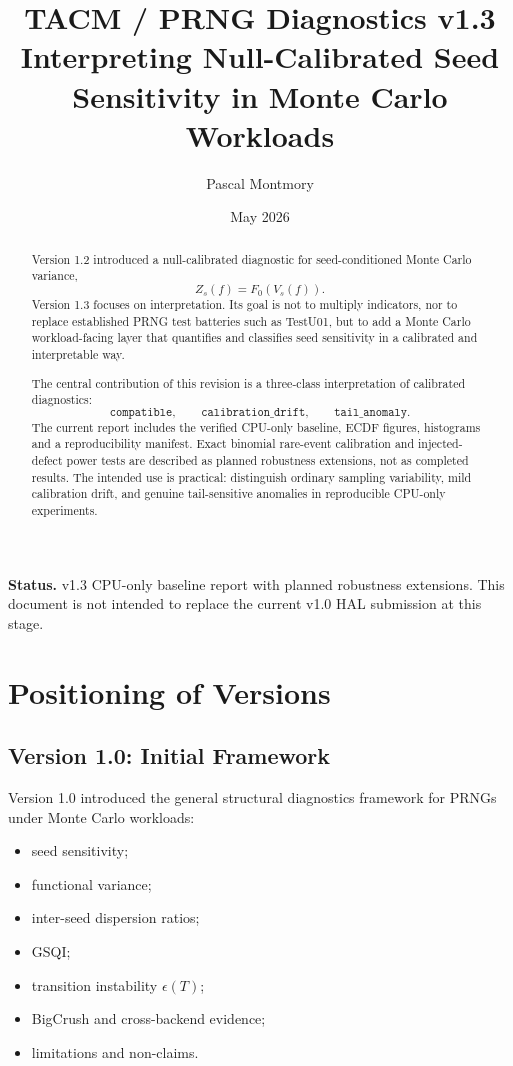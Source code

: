 \documentclass[11pt,a4paper]{article}
\title{\textbf{TACM / PRNG Diagnostics v1.3}\\
\large Interpreting Null-Calibrated Seed Sensitivity in Monte Carlo Workloads}
\author{Pascal Montmory}
\date{May 2026}
\begin{document}
\maketitle
\noindent\textbf{Status.} v1.3 CPU-only baseline report with planned robustness extensions. This document is not intended to replace the current v1.0 HAL submission at this stage.

\begin{abstract}
Version 1.2 introduced a null-calibrated diagnostic for seed-conditioned Monte Carlo variance,
\[
Z_s(f)=F_0(V_s(f)).
\]
Version 1.3 focuses on interpretation. Its goal is not to multiply indicators, nor to replace established PRNG test batteries such as TestU01, but to add a Monte Carlo workload-facing layer that quantifies and classifies seed sensitivity in a calibrated and interpretable way.

The central contribution of this revision is a three-class interpretation of calibrated diagnostics:
\[
\texttt{compatible},\qquad
\texttt{calibration\_drift},\qquad
\texttt{tail\_anomaly}.
\]
The current report includes the verified CPU-only baseline, ECDF figures, histograms and a reproducibility manifest. Exact binomial rare-event calibration and injected-defect power tests are described as planned robustness extensions, not as completed results. The intended use is practical: distinguish ordinary sampling variability, mild calibration drift, and genuine tail-sensitive anomalies in reproducible CPU-only experiments.
\end{abstract}

\section{Positioning of Versions}

\subsection{Version 1.0: Initial Framework}

Version 1.0 introduced the general structural diagnostics framework for PRNGs under Monte Carlo workloads:
\begin{itemize}
  \item seed sensitivity;
  \item functional variance;
  \item inter-seed dispersion ratios;
  \item GSQI;
  \item transition instability $\epsilon(T)$;
  \item BigCrush and cross-backend evidence;
  \item limitations and non-claims.
\end{itemize}
\end{document}
